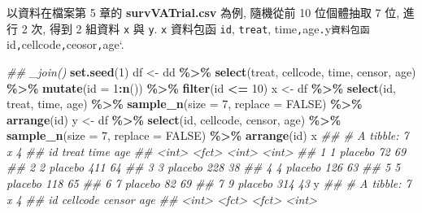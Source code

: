 \documentclass[
]{book}
\newenvironment{Shaded}{\begin{snugshade}}{\end{snugshade}}
\newcommand{\CommentTok}[1]{\textcolor[rgb]{0.56,0.35,0.01}{\textit{#1}}}
\newcommand{\DataTypeTok}[1]{\textcolor[rgb]{0.13,0.29,0.53}{#1}}
\newcommand{\DecValTok}[1]{\textcolor[rgb]{0.00,0.00,0.81}{#1}}
\newcommand{\KeywordTok}[1]{\textcolor[rgb]{0.13,0.29,0.53}{\textbf{#1}}}
\newcommand{\NormalTok}[1]{#1}
\newcommand{\OperatorTok}[1]{\textcolor[rgb]{0.81,0.36,0.00}{\textbf{#1}}}
\newcommand{\OtherTok}[1]{\textcolor[rgb]{0.56,0.35,0.01}{#1}}
\newcommand{\StringTok}[1]{\textcolor[rgb]{0.31,0.60,0.02}{#1}}
\begin{document}
以資料在檔案第 5 章的 \textbf{survVATrial.csv} 為例,
隨機從前 10 位個體抽取 7 位, 進行 2 次, 得到 2 組資料 \texttt{x} 與 \texttt{y}.
\texttt{x} 資料包函 \texttt{id}, \texttt{treat}, time\texttt{,}age\texttt{.}y\texttt{資料包函}id\texttt{,}cellcode\texttt{,}ceosor\texttt{,}age`.

\begin{Shaded}
\begin{Highlighting}[]
\CommentTok{\#\# \_join()}
\KeywordTok{set.seed}\NormalTok{(}\DecValTok{1}\NormalTok{)}
\NormalTok{df \textless{}{-}}\StringTok{ }\NormalTok{dd }\OperatorTok{\%\textgreater{}\%}\StringTok{ }
\StringTok{  }\KeywordTok{select}\NormalTok{(treat, cellcode, time, censor, age) }\OperatorTok{\%\textgreater{}\%}\StringTok{ }
\StringTok{  }\KeywordTok{mutate}\NormalTok{(}\DataTypeTok{id =} \DecValTok{1}\OperatorTok{:}\KeywordTok{n}\NormalTok{()) }\OperatorTok{\%\textgreater{}\%}
\StringTok{  }\KeywordTok{filter}\NormalTok{(id }\OperatorTok{\textless{}=}\StringTok{ }\DecValTok{10}\NormalTok{) }
\NormalTok{x \textless{}{-}}\StringTok{ }\NormalTok{df }\OperatorTok{\%\textgreater{}\%}\StringTok{ }
\StringTok{  }\KeywordTok{select}\NormalTok{(id, treat, time, age) }\OperatorTok{\%\textgreater{}\%}\StringTok{ }
\StringTok{  }\KeywordTok{sample\_n}\NormalTok{(}\DataTypeTok{size =} \DecValTok{7}\NormalTok{, }\DataTypeTok{replace =} \OtherTok{FALSE}\NormalTok{) }\OperatorTok{\%\textgreater{}\%}
\StringTok{  }\KeywordTok{arrange}\NormalTok{(id)}
\NormalTok{y \textless{}{-}}\StringTok{ }\NormalTok{df }\OperatorTok{\%\textgreater{}\%}\StringTok{ }
\StringTok{  }\KeywordTok{select}\NormalTok{(id, cellcode, censor, age) }\OperatorTok{\%\textgreater{}\%}\StringTok{ }
\StringTok{  }\KeywordTok{sample\_n}\NormalTok{(}\DataTypeTok{size =} \DecValTok{7}\NormalTok{, }\DataTypeTok{replace =} \OtherTok{FALSE}\NormalTok{)  }\OperatorTok{\%\textgreater{}\%}
\StringTok{  }\KeywordTok{arrange}\NormalTok{(id)}
\NormalTok{x}
\CommentTok{\#\# \# A tibble: 7 x 4}
\CommentTok{\#\#      id treat    time   age}
\CommentTok{\#\#   \textless{}int\textgreater{} \textless{}fct\textgreater{}   \textless{}int\textgreater{} \textless{}int\textgreater{}}
\CommentTok{\#\# 1     1 placebo    72    69}
\CommentTok{\#\# 2     2 placebo   411    64}
\CommentTok{\#\# 3     3 placebo   228    38}
\CommentTok{\#\# 4     4 placebo   126    63}
\CommentTok{\#\# 5     5 placebo   118    65}
\CommentTok{\#\# 6     7 placebo    82    69}
\CommentTok{\#\# 7     9 placebo   314    43}
\NormalTok{y}
\CommentTok{\#\# \# A tibble: 7 x 4}
\CommentTok{\#\#      id cellcode censor     age}
\CommentTok{\#\#   \textless{}int\textgreater{} \textless{}fct\textgreater{}    \textless{}fct\textgreater{}    \textless{}int\textgreater{}}

\end{Highlighting}
\end{Shaded}
\end{document}
